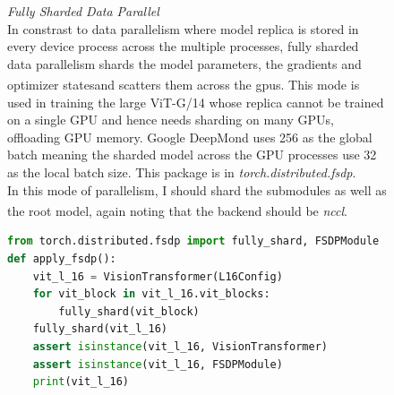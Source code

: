 \documentclass[12pt]{article}
\newcommand{\customtext}[3]{%
    \vspace{#2} %
    \fontsize{13}{8}\textcolor{#1}{\textit{#3}}%
}
\newcommand{\sidecite}[1]{\textsuperscript{\textcolor{blue}{\textbf{\scriptsize#1}}}}
\newcommand{\maincitecount}{\sidecite{\stepcounter{maincite}\themaincite}}
\begin{document}
\begin{figure}[!htb]
    \begin{minipage}[t]{0.65\textwidth}
    
    \customtext{xtitle}{0em}{Fully Sharded Data Parallel}\\
    In constrast to data parallelism where model replica is stored in every device process 
    across the multiple processes, fully sharded data parallelism shards the model parameters,
    the gradients and optimizer states\maincitecount and scatters them across the gpus. 
    This mode is used in training the large {ViT-G/14} whose replica cannot be trained on a single
     GPU and hence needs sharding on many GPUs, offloading GPU memory. Google DeepMond 
     uses 256 as the global batch meaning the sharded model across the GPU processes use 
     32 as the local batch size. This package is in {\it\color{xlink}torch.distributed.fsdp}.\\
    In this mode of parallelism, I should shard the submodules as well as the root model\maincitecount,
    again noting that the backend should be {\it nccl}. 
\begin{lstlisting}[language=python,style=python,basicstyle=\ttfamily\footnotesize]
from torch.distributed.fsdp import fully_shard, FSDPModule
def apply_fsdp():
    vit_l_16 = VisionTransformer(L16Config)
    for vit_block in vit_l_16.vit_blocks:
        fully_shard(vit_block)
    fully_shard(vit_l_16)
    assert isinstance(vit_l_16, VisionTransformer)
    assert isinstance(vit_l_16, FSDPModule)
    print(vit_l_16)


\end{lstlisting}
\end{minipage}
\end{figure}
\end{document}
